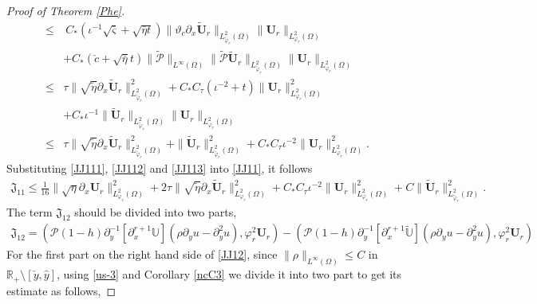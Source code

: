 \documentclass[10pt,a4paper]{amsart}
\begin{document}
\begin{proof}[Proof of Theorem \ref{Phe}]
\begin{align}
\leq&~C_{*}(\iota^{-1}\sqrt{\bar{\varsigma}}+\sqrt{\bar{\eta}t})
           \|\vartheta_{c}\partial_{x}\tilde{\mathbf{U}}_{r}\|_{L_{\tilde{\varphi}_{r}}^{2}(\Omega)}\|\mathbf{U}_{r}\|_{L_{\varphi_{r}}^{2}(\Omega)}\nonumber\\
    &+C_{*}(\check{c}+\sqrt{\bar{\eta}}t)\|\tilde{\mathcal{P}}\|_{L^{\infty}(\Omega)}
           \|\tilde{\mathcal{P}}\tilde{\mathbf{U}}_{r}\|_{L_{\tilde{\varphi}_{r}}^{2}(\Omega)}\|\mathbf{U}_{r}\|_{L_{\varphi_{r}}^{2}(\Omega)}\nonumber\\
\leq& \tau\|\sqrt{\tilde{\eta}}\partial_{x}\tilde{\mathbf{U}}_{r}\|_{L_{\tilde{\varphi}_{r}}^{2}(\Omega)}^{2}
     +C_{*}C_{\tau}(\iota^{-2}+t)\|\mathbf{U}_{r}\|_{L_{\varphi_{r}}^{2}(\Omega)}^{2}\nonumber\\
    &+C_{*}\iota^{-1}\|\tilde{\mathbf{U}}_{r}\|_{L_{\tilde{\varphi}_{r}}^{2}(\Omega)}\|\mathbf{U}_{r}\|_{L_{\varphi_{r}}^{2}(\Omega)}\nonumber\\
\leq& \tau\|\sqrt{\tilde{\eta}}\partial_{x}\tilde{\mathbf{U}}_{r}\|_{L_{\tilde{\varphi}_{r}}^{2}(\Omega)}^{2}
     +\|\tilde{\mathbf{U}}_{r}\|_{L_{\tilde{\varphi}_{r}}^{2}(\Omega)}^{2}
     +C_{*}C_{\tau}\iota^{-2}\|\mathbf{U}_{r}\|_{L_{\varphi_{r}}^{2}(\Omega)}^{2}.\nonumber
\end{align}
Substituting \eqref{JJ111}, \eqref{JJ112} and \eqref{JJ113} into \eqref{JJ11}, it follows
\begin{align}\label{JJ11'}
\mathfrak{J}_{11}
\leq \frac{1}{16}\|\sqrt{\eta}\partial_{x}\mathbf{U}_{r}\|_{L_{\varphi_{r}}^{2}(\Omega)}^{2}
    +2\tau\|\sqrt{\tilde{\eta}}\partial_{x}\tilde{\mathbf{U}}_{r}\|_{L_{\varphi_{r}}^{2}(\Omega)}^{2}
    +C_{*}C_{\tau}\iota^{-2}\|\mathbf{U}_{r}\|_{L_{\varphi_{r}}^{2}(\Omega)}^{2}
    +C\|\tilde{\mathbf{U}}_{r}\|_{L_{\tilde{\varphi}_{r}}^{2}(\Omega)}^{2}.
\end{align}
The term $\mathfrak{J}_{12}$ should be divided into two parts,
\begin{align}\label{JJ12}
\mathfrak{J}_{12}
= (\mathcal{P}(1-h)\partial_{y}^{-1}[\partial_{x}^{r+1}\mathbb{U}](\rho\partial_{y}u-\partial_{y}^{2}u),\varphi_{r}^{2}\mathbf{U}_{r})
 -(\mathcal{P}(1-h)\partial_{y}^{-1}[\partial_{x}^{r+1}\tilde{\mathbb{U}}](\rho\partial_{y}u-\partial_{y}^{2}u),\varphi_{r}^{2}\mathbf{U}_{r})
\end{align}
For the first part on the right hand side of \eqref{JJ12}, since
$\|\rho\|_{L^{\infty}(\Omega)}\leq C$ in $\mathbb{R}_{+}\setminus[\check{y},\hat{y}]$,
using \eqref{us-3} and Corollary \ref{ncC3}  we divide it into two part to get its estimate as follows,

\end{proof}
\end{document}
